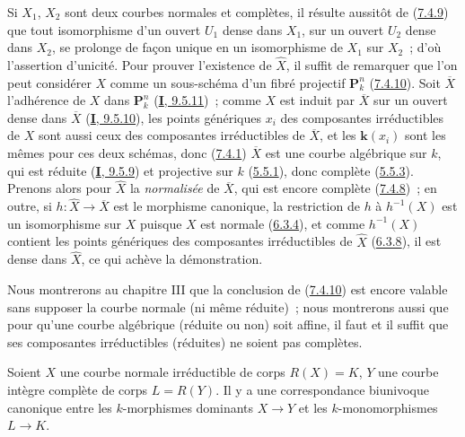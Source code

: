 Si $X_1$, $X_2$ sont deux courbes normales et complètes, il résulte aussitôt
de (\hyperref[II.7.4.9-fr]{7.4.9}) que tout isomorphisme d'un ouvert $U_1$
dense dans $X_1$, sur un ouvert $U_2$ dense dans $X_2$, se prolonge de façon
unique en un isomorphisme de $X_1$ sur $X_2$~; d'où l'assertion d'unicité. Pour
prouver l'existence de $\widehat{X}$, il suffit de remarquer que l'on peut
considérer $X$ comme un sous-schéma d'un fibré projectif $\mathbf{P}_k^n$
(\hyperref[II.7.4.10-fr]{7.4.10}). Soit $\overline{X}$ l'adhérence de $X$ dans
$\mathbf{P}_k^n$ (\hyperref[I.9.5.11-fr]{\textbf{I}, 9.5.11})~; comme $X$ est induit
par $\overline{X}$ sur un ouvert dense dans $\overline{X}$
(\hyperref[I.9.5.10-fr]{\textbf{I}, 9.5.10}), les points génériques $x_i$ des
composantes irréductibles de $X$ sont aussi ceux des composantes irréductibles
de $\overline{X}$, et les $\boldsymbol{k}(x_i)$ sont les mêmes pour ces deux schémas, donc
(\hyperref[II.7.4.1-fr]{7.4.1}) $\overline{X}$ est une courbe algébrique sur
$k$, qui est réduite (\hyperref[I.9.5.9-fr]{\textbf{I}, 9.5.9}) et projective sur $k$
(\hyperref[II.5.5.1-fr]{5.5.1}), donc complète
(\hyperref[II.5.5.3-fr]{5.5.3}). Prenons alors pour $\widehat{X}$ la
\emph{normalisée} de $\overline{X}$, qui est encore complète
(\hyperref[II.7.4.8-fr]{7.4.8})~; en outre, si
$h:\widehat{X}\to\overline{X}$ est le morphisme canonique, la restriction de
$h$ à $h^{-1}(X)$ est un isomorphisme sur $X$ puisque $X$ est normale
(\hyperref[II.6.3.4-fr]{6.3.4}), et comme $h^{-1}(X)$ contient les points
génériques des composantes irréductibles de $\widehat{X}$
(\hyperref[II.6.3.8-fr]{6.3.8}), il est dense dans $\widehat{X}$, ce qui achève
la démonstration.


\begin{remark}[7.4.12]
\label{II.7.4.12-fr}
Nous montrerons au chapitre III que la conclusion de
(\hyperref[II.7.4.10-fr]{7.4.10}) est encore valable sans supposer la courbe
normale (ni même réduite)~; nous montrerons aussi que pour qu'une courbe
algébrique (réduite ou non) soit affine, il faut et il suffit que ses
composantes irréductibles (réduites) ne soient pas complètes.
\end{remark}

\begin{corollary}[7.4.13]
\label{II.7.4.13-fr}
Soient $X$ une courbe \textup{normale} irréductible de corps $R(X)=K$, $Y$ une courbe
intègre \textup{complète} de corps $L=R(Y)$. Il y a une correspondance biunivoque
canonique entre les $k$-morphismes \textup{dominants} $X\to Y$ et les
$k$-monomorphismes $L\to K$.
\end{corollary}

